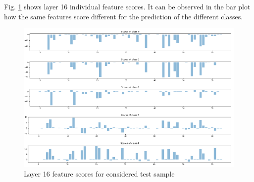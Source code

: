\documentclass[preprint]{elsarticle}
\theoremstyle{definition} %
\theoremstyle{remark}
\begin{document}
Fig. \ref{fig:feature_scores} shows layer 16 individual feature scores. It can be observed in the bar plot how the same features score different for the prediction of the different classes.

\begin{figure}[h!]
	\centering
	\includegraphics[width=\textwidth]{figures/score-prop-23713_left/feature-scores.png}
	\caption{Layer 16 feature scores for considered test sample}
	\label{fig:feature_scores}
\end{figure}
\end{document}
